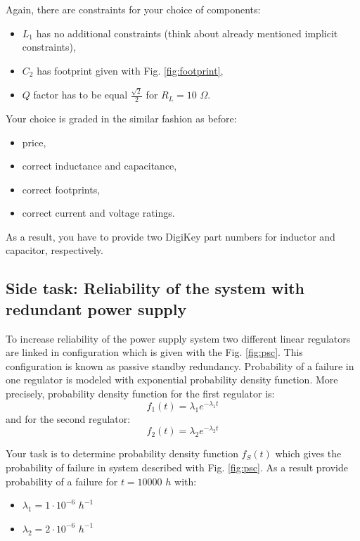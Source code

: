 \documentclass{article}
\begin{document}
Again, there are constraints for your choice of components:
\begin{itemize}
	\item $L_1$ has no additional constraints 
	(think about already mentioned implicit constraints),
	\item $C_2$ has footprint given with Fig. \ref{fig:footprint},
	\item $Q$ factor has to be equal $\frac{\sqrt{2}}{2}$ for $R_L = 10$ 
	$\Omega$.  
\end{itemize}

Your choice is graded in the similar fashion as before:
\begin{itemize}
	\item price,
	\item correct inductance and capacitance,
	\item correct footprints, 
	\item correct current and voltage ratings.
\end{itemize}
As a result, you have to provide two DigiKey part numbers for inductor and 
capacitor, respectively. 
\newpage
\subsection{Side task: Reliability of the system with redundant power supply} 
\label{ele:task:3}
To increase reliability of the power supply system two different linear 
regulators are linked in configuration which is given with the Fig. 
\ref{fig:psc}. This configuration is known as passive standby redundancy. 
Probability of a failure in one regulator is modeled with exponential 
probability density function. More precisely, probability density function for 
the first regulator is:  
\begin{equation}
f_1(t) = \lambda_1 e^{-\lambda_1 t}
\end{equation}
and for the second regulator:
\begin{equation}
f_2(t) = \lambda_2 e^{-\lambda_2 t}
\end{equation}

Your task is to determine probability density function $f_S(t)$ which gives the
probability of failure in system described with Fig. \ref{fig:psc}. As a result 
provide probability of a failure for $t = 10000$ $h$ with:
\begin{itemize}
	\item[] $\lambda_1 = 1 \cdot10^{-6}$ $h^{-1}$
	\item[] $\lambda_2 = 2 \cdot10^{-6}$ $h^{-1}$ 
\end{itemize} 
\end{document}
